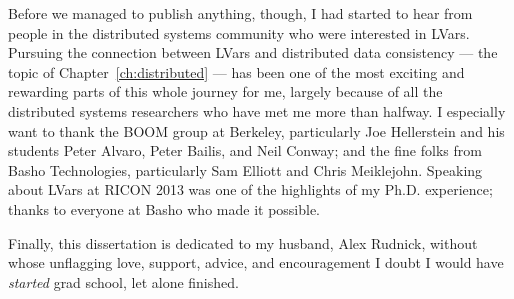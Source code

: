 Before we managed to publish anything, though, I had started to hear from people in the distributed systems community who were interested in LVars.  Pursuing the connection between LVars and distributed data consistency --- the topic of Chapter~\ref{ch:distributed} --- has been one of the most exciting and rewarding parts of this whole journey for me, largely because of all the distributed systems researchers who have met me more than halfway.  I especially want to thank the BOOM group at Berkeley, particularly Joe Hellerstein and his students Peter Alvaro, Peter Bailis, and Neil Conway; and the fine folks from Basho Technologies, particularly Sam Elliott and Chris Meiklejohn.  Speaking about LVars at RICON 2013 was one of the highlights of my Ph.D. experience; thanks to everyone at Basho who made it possible.


Finally, this dissertation is dedicated to my husband, Alex Rudnick, without whose unflagging love, support, advice, and encouragement I doubt I would have \emph{started} grad school, let alone finished.
